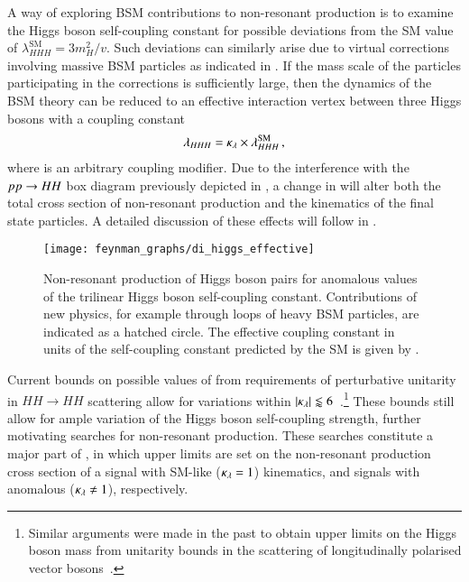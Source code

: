A way of exploring BSM contributions to non-resonant \HH production is to
examine the Higgs boson self-coupling constant for possible deviations from the
SM value of $\lambda_{HHH}^\text{SM} = 3 m_{H}^2 / v$. Such deviations can
similarly arise due to virtual corrections involving massive BSM particles as
indicated in . If the mass scale of the particles
participating in the corrections is sufficiently large, then the dynamics of the
BSM theory can be reduced to an effective interaction vertex between three Higgs
bosons with a coupling constant
\begin{align*}
  \lambda_{HHH} = \kappa_{\lambda} \times \lambda_{HHH}^{\text{SM}} \,\text{,}
\end{align*}
where \klambda is an arbitrary coupling modifier. Due to the interference with
the $pp \to HH$ box diagram previously depicted in
, a change in \klambda will alter both the total
cross section of non-resonant \HH production and the kinematics of the final
state particles. A detailed discussion of these effects will follow in
.

\begin{figure}[htbp]
  \centering

  \texttt{[image: feynman\_graphs/di\_higgs\_effective]}

  \caption{Non-resonant production of Higgs boson pairs for anomalous values of
    the trilinear Higgs boson self-coupling constant.  Contributions of new
    physics, for example through loops of heavy BSM particles, are indicated as
    a hatched circle. The effective coupling constant in units of the
    self-coupling constant predicted by the SM is given by \klambda.}%
  \label{fig:bsm_hh_prod_feyn}
\end{figure}

%
Current bounds on possible values of \klambda from requirements of perturbative
unitarity in $HH \to HH$ scattering allow for variations within
$|\kappa_{\lambda}| \lessapprox 6$~\cite{DiLuzio:2017tfn}.\footnote{Similar arguments
  were made in the past to obtain upper limits on the Higgs boson mass from
  unitarity bounds in the scattering of longitudinally polarised vector
  bosons~\cite{Lee:1977eg}.} These bounds still allow for ample variation of the
Higgs boson self-coupling strength, further motivating searches for non-resonant
\HH production. These searches constitute a major part of
, in which upper limits are set on the
non-resonant \HH production cross section of a signal with SM-like
($\kappa_{\lambda} = 1$) kinematics, and signals with anomalous \klambda
($\kappa_{\lambda} \neq 1$), respectively.

